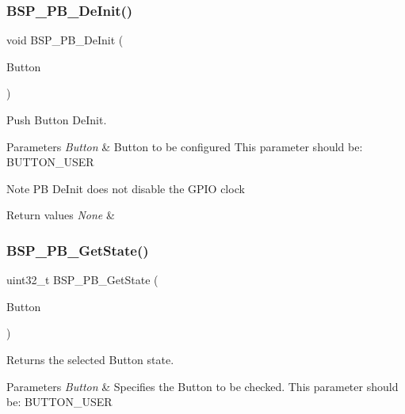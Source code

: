 \subsubsection{\texorpdfstring{B\+S\+P\+\_\+\+P\+B\+\_\+\+De\+Init()}{BSP\_PB\_DeInit()}}
{\footnotesize\ttfamily void B\+S\+P\+\_\+\+P\+B\+\_\+\+De\+Init (\begin{DoxyParamCaption}\item[{Button\+\_\+\+Type\+Def}]{Button }\end{DoxyParamCaption})}



Push Button De\+Init. 


\begin{DoxyParams}{Parameters}
{\em Button} & Button to be configured This parameter should be\+: B\+U\+T\+T\+O\+N\+\_\+\+U\+S\+ER \\
\hline
\end{DoxyParams}
\begin{DoxyNote}{Note}
PB De\+Init does not disable the G\+P\+IO clock 
\end{DoxyNote}

\begin{DoxyRetVals}{Return values}
{\em None} & \\
\hline
\end{DoxyRetVals}
\mbox{\label{group___s_t_m32_f0_x_x___n_u_c_l_e_o___b_u_t_t_o_n___functions_ga8f0978b6cffda9c67266ddfdb3a0abf7}} 
\subsubsection{\texorpdfstring{B\+S\+P\+\_\+\+P\+B\+\_\+\+Get\+State()}{BSP\_PB\_GetState()}}
{\footnotesize\ttfamily uint32\+\_\+t B\+S\+P\+\_\+\+P\+B\+\_\+\+Get\+State (\begin{DoxyParamCaption}\item[{Button\+\_\+\+Type\+Def}]{Button }\end{DoxyParamCaption})}



Returns the selected Button state. 


\begin{DoxyParams}{Parameters}
{\em Button} & Specifies the Button to be checked. This parameter should be\+: B\+U\+T\+T\+O\+N\+\_\+\+U\+S\+ER \\
\hline
\end{DoxyParams}

